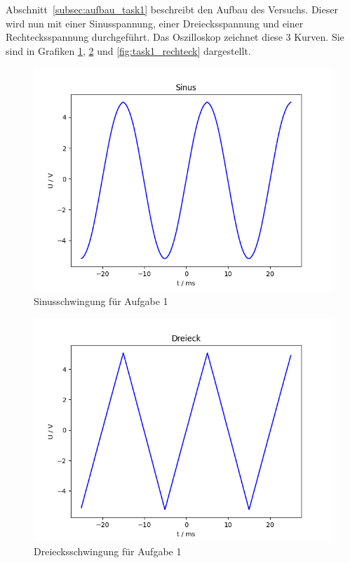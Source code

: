 \documentclass{article}
\begin{document}
Abschnitt~\ref{subsec:aufbau_task1} beschreibt den Aufbau des Versuchs. Dieser wird nun mit einer Sinusspannung, einer Dreiecksspannung und einer Rechtecksspannung durchgeführt. Das Oszilloskop zeichnet diese 3 Kurven. Sie sind in Grafiken \ref{fig:task1_sin}, \ref{fig:task1_dreieck} und \ref{fig:task1_rechteck} dargestellt.


\begin{figure}[H]
\centering
\caption{Sinusschwingung für Aufgabe 1}
\label{fig:task1_sin}
\includegraphics[scale=0.5]{bilder/task1_sin.png}
\end{figure}

\begin{figure}[H]
\centering
\caption{Dreiecksschwingung für Aufgabe 1}
\label{fig:task1_dreieck}
\includegraphics[scale=0.5]{bilder/task1_dreieck.png}
\end{figure}
\end{document}
